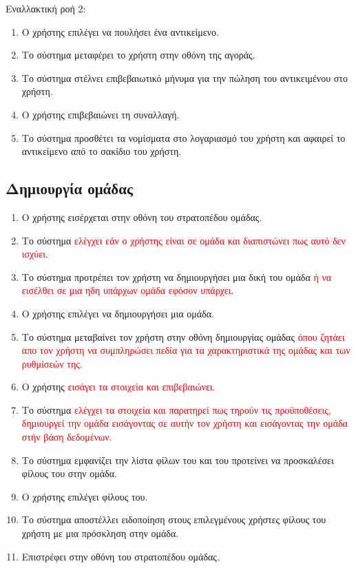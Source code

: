 Εναλλακτική ροή 2:
\begin{enumerate}[label=5.\alph*.,ref=5.\alph*]
\item Ο χρήστης επιλέγει να πουλήσει ένα αντικείμενο.
\item Το σύστημα μεταφέρει το χρήστη στην οθόνη της αγοράς.
\item Το σύστημα στέλνει επιβεβαιωτικό μήνυμα για την πώληση του αντικειμένου στο χρήστη.
\item Ο χρήστης επιβεβαιώνει τη συναλλαγή.
\item Το σύστημα προσθέτει τα νομίσματα στο λογαριασμό του χρήστη και αφαιρεί το αντικείμενο από το σακίδιο του χρήστη.
\end{enumerate}

\newpage
\subsection{Δημιουργία ομάδας}
\label{sec:createclan}
\begin{enumerate}
\item Ο χρήστης εισέρχεται στην οθόνη του στρατοπέδου ομάδας.
\item Το σύστημα \textcolor{red}{ελέγχει εάν ο χρήστης είναι σε ομάδα και διαπιστώνει πως αυτό δεν ισχύει}.
\item Το σύστημα προτρέπει τον χρήστη να δημιουργήσει μια δική του ομάδα\textcolor{red}{ ή να εισέλθει σε μια ηδη υπάρχων ομάδα εφόσον υπάρχει}.
\item Ο χρήστης επιλέγει να δημιουργήσει μια ομάδα.
\item Το σύστημα μεταβαίνει τον χρήστη στην οθόνη δημιουργίας ομάδας \textcolor{red}{όπου ζητάει απο τον χρήστη να συμπληρώσει πεδία για τα χαρακτηριστικά της ομάδας και των ρυθμίσεών της.}
\item Ο χρήστης \textcolor{red}{εισάγει τα στοιχεία και επιβεβαιώνει.}
\item Το σύστημα \textcolor{red}{ελέγχει τα στοιχεία και παρατηρεί πως τηρούν τις προϋποθέσεις, δημιουργεί την ομάδα εισάγοντας σε αυτήν τον χρήστη και εισάγοντας την ομάδα στήν βάση δεδομένων.}
\item Το σύστημα εμφανίζει την λίστα φίλων του και του προτείνει να προσκαλέσει φίλους του στην ομάδα.
\item Ο χρήστης επιλέγει φίλους του.
\item Το σύστημα αποστέλλει ειδοποίηση στους επιλεγμένους χρήστες φίλους του χρήστη με μια πρόσκληση στην ομάδα.
\item Επιστρέφει στην οθόνη του στρατοπέδου ομάδας.
\end{enumerate}

